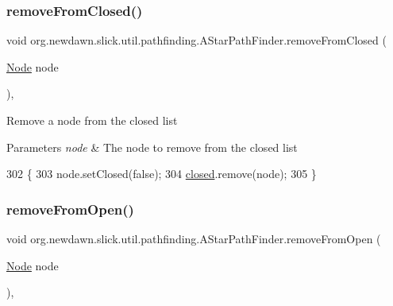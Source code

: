 \subsubsection{\texorpdfstring{remove\+From\+Closed()}{removeFromClosed()}}
{\footnotesize\ttfamily void org.\+newdawn.\+slick.\+util.\+pathfinding.\+A\+Star\+Path\+Finder.\+remove\+From\+Closed (\begin{DoxyParamCaption}\item[{\mbox{\hyperlink{classorg_1_1newdawn_1_1slick_1_1util_1_1pathfinding_1_1_a_star_path_finder_1_1_node}{Node}}}]{node }\end{DoxyParamCaption})\hspace{0.3cm}{\ttfamily [inline]}, {\ttfamily [protected]}}

Remove a node from the closed list


\begin{DoxyParams}{Parameters}
{\em node} & The node to remove from the closed list \\
\hline
\end{DoxyParams}

\begin{DoxyCode}
302                                                \{
303         node.setClosed(\textcolor{keyword}{false});
304         \mbox{\hyperlink{classorg_1_1newdawn_1_1slick_1_1util_1_1pathfinding_1_1_a_star_path_finder_aa8d4b6dec216f8e3f070889f1c722921}{closed}}.remove(node);
305     \}
\end{DoxyCode}
\mbox{\label{classorg_1_1newdawn_1_1slick_1_1util_1_1pathfinding_1_1_a_star_path_finder_a3efb779275ef97f7e5dc164be0488c08}} 
\subsubsection{\texorpdfstring{remove\+From\+Open()}{removeFromOpen()}}
{\footnotesize\ttfamily void org.\+newdawn.\+slick.\+util.\+pathfinding.\+A\+Star\+Path\+Finder.\+remove\+From\+Open (\begin{DoxyParamCaption}\item[{\mbox{\hyperlink{classorg_1_1newdawn_1_1slick_1_1util_1_1pathfinding_1_1_a_star_path_finder_1_1_node}{Node}}}]{node }\end{DoxyParamCaption})\hspace{0.3cm}{\ttfamily [inline]}, {\ttfamily [protected]}}

